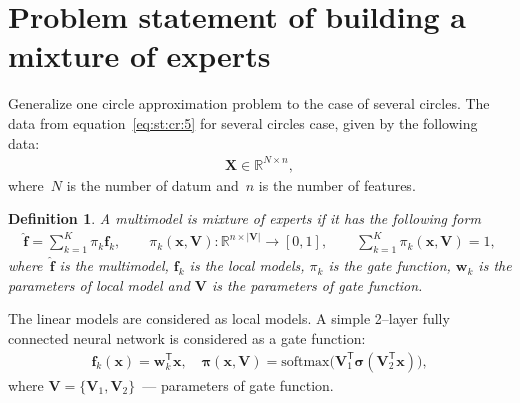 \documentclass[12pt, twoside]{article}
\newtheorem{definition}{Definition}[section]
\begin{document}
\section{Problem statement of building a mixture of experts}
Generalize one circle approximation problem to the case of several circles.
The data from equation~\eqref{eq:st:cr:5} for several circles case, given by the following data:
\[
\label{eq:st:1}
\begin{aligned}
\textbf{X} \in \mathbb{R}^{N \times n},
\end{aligned}
\]
where~$N$ is the number of datum and~$n$ is the number of features.
\begin{definition}
\label{def:1}
A multimodel is mixture of experts if it has the following form
\[
\label{eq:st:2}
\begin{aligned}
\hat{\mathbf{f}} = \sum_{k=1}^{K}\pi_{k}\mathbf{f}_k, \qquad \pi_{k}\left(\mathbf{x}, \mathbf{V}\right):\mathbb{R}^{n\times \left|\mathbf{V}\right|} \to [0, 1], \qquad \sum_{k=1}^{K}\pi_{k}\left(\mathbf{x}, \mathbf{V}\right) = 1,
\end{aligned}
\]
where~$\hat{\mathbf{f}}$ is the multimodel, $\mathbf{f}_k$ is the local models, $\pi_k$ is the gate function, $\mathbf{w}_k$ is the parameters of local model and $\mathbf{V}$ is the parameters of gate function.
\end{definition}

The linear models are considered as local models. A simple 2--layer fully connected neural network is considered as a gate function:
\[
\label{eq:st:3}
\begin{aligned}
\mathbf{f}_k\left(\textbf{x}\right) = \textbf{w}_k^{\mathsf{T}}\textbf{x}, \quad
\bm{\pi}\left(\mathbf{x}, \mathbf{V}\right) = \text{softmax}\bigr(\mathbf{V}_{1}^{\mathsf{T}}\bm{\sigma}\left(\mathbf{V}_2^{\mathsf{T}}\mathbf{x}\right)\bigr),
\end{aligned}
\]
where $\mathbf{V} = \bigr\{\mathbf{V}_1, \mathbf{V}_2\bigr\}$~--- parameters of gate function.
\end{document}

